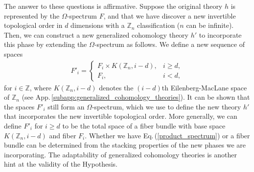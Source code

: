 \documentclass[sort&compress]{elsarticle}
\theoremstyle{theoremstyle}
\theoremstyle{framedtheoremstyle}
\theoremstyle{definitionstyle}
\theoremstyle{definitionstyle}
\theoremstyle{definitionstyle}
\theoremstyle{definitionstyle}
\theoremstyle{nameddefinitionstyle}
\theoremstyle{framednameddefinitionstyle}
\theoremstyle{proofstyle}
\theoremstyle{definitionstyle}
\newcommand{\ZZZ}{\mathbb{Z}}
\begin{document}
The answer to these questions is affirmative. Suppose the original theory $h$ is represented by the $\Omega$-spectrum $F$, and that we have discover a new invertible topological order in $d$ dimensions with a $\ZZZ_n$ classification ($n$ can be infinite). Then, we can construct a new generalized cohomology theory $h'$ to incorporate this phase by extending the $\Omega$-spectrum as follows. We define a new sequence of spaces
\begin{eqnarray}
F'_i = \begin{cases}
F_i \times K(\ZZZ_n, i-d), & i \geq d, \\
F_i, & i < d,
\end{cases}\label{product_spectrum}
\end{eqnarray}
for $i \in \ZZZ$, where $K(\ZZZ_n, i-d)$ denotes the $(i-d)$th Eilenberg-MacLane space of $\ZZZ_n$ (see App.\,\ref{subapp:generalized_cohomology_theories}). It can be shown that the spaces $F'_i$ still form an $\Omega$-spectrum, which we use to define the new theory $h'$ that incorporates the new invertible topological order. More generally, we can define $F'_i$ for $i\geq d$ to be the total space of a fiber bundle with base space $K(\ZZZ_n, i-d)$ and fiber $F_i$. Whether we have Eq.\,(\ref{product_spectrum}) or a fiber bundle can be determined from the stacking properties of the new phases we are incorporating. The adaptability of generalized cohomology theories is another hint at the validity of the Hypothesis.
\end{document}
